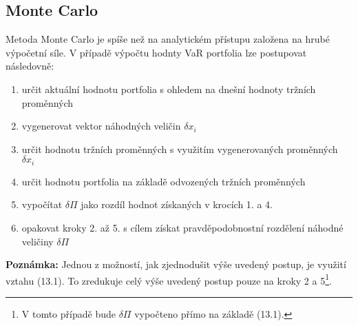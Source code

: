 \documentclass[a4paper]{book}
\begin{document}
\subsection{Monte Carlo}
Metoda Monte Carlo je spíše než na analytickém přístupu založena na hrubé výpočetní síle. V případě výpočtu hodnty VaR portfolia lze postupovat následovně:
\begin{enumerate}
\item určit aktuální hodnotu portfolia s ohledem na dnešní hodnoty tržních proměnných
\item vygenerovat vektor náhodných veličin $\delta x_i$
\item určit hodnotu tržních proměnných s využitím vygenerovaných proměnných $\delta x_i$
\item určit hodnotu portfolia na základě odvozených tržních proměnných
\item vypočítat $\delta \Pi$ jako rozdíl hodnot získaných v krocích 1. a 4.
\item opakovat kroky 2. až 5. s cílem získat pravděpodobnostní rozdělení náhodné veličiny $\delta \Pi$
\end{enumerate}

\noindent \textbf{Poznámka:} Jednou z možností, jak zjednodušit výše uvedený postup, je využití vztahu (13.1). To zredukuje celý výše uvedený postup pouze na kroky 2 a 5\footnote{V tomto případě bude $\delta \Pi$ vypočteno přímo na základě (13.1).}.
\end{document}
